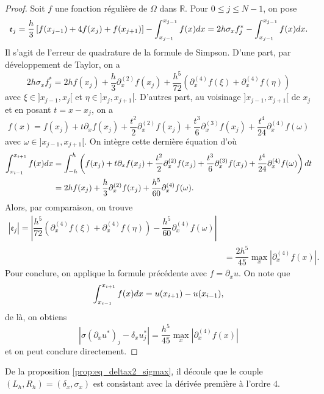 \begin{itemize}
\begin{proof}
Soit $f$ une fonction régulière de $\Omega$ dans $\mathbb{R}$. Pour $0 \leq j \leq N-1$, on pose
\begin{equation}
\mathfrak{e}_j = \dfrac{h}{3} \left[ f(x_{j-1}) + 4 f(x_j) + f(x_{j+1}) \right] - \displaystyle\int_{x_{j-1}}^{x_{j-1}} f(x) dx = 2h \sigma_x f^*_j - \displaystyle\int_{x_{j-1}}^{x_{j-1}} f(x) dx.
\end{equation}
Il s'agit de l'erreur de quadrature de la formule de Simpson.
D'une part, par développement de Taylor, on a
\begin{equation}
2h \sigma_x f^*_j = 2h f(x_j) + \dfrac{h}{3}\partial_x^{(2)}f(x_j) + \dfrac{h^5}{72} \left( \partial_x^{(4)}f(\xi) + \partial_x^{(4)}f(\eta) \right) 
\end{equation}
avec $\xi \in ]x_{j-1}, x_j[$ et $\eta \in ]x_j, x_{j+1}[$.
D'autres part, au voisinage $]x_{j-1}, x_{j+1}[$ de $x_j$ et en posant $t=x-x_j$, on a 
\begin{equation}
f(x) = f(x_j) + t \partial_x f(x_j) + \dfrac{t^2}{2} \partial_x^{(2)} f(x_j) + \dfrac{t^3}{6} \partial_x^{(3)} f(x_j) + \dfrac{t^4}{24} \partial_x^{(4)} f(\omega)
\end{equation}
avec $\omega \in ]x_{j-1}, x_{j+1}[$. On intègre cette dernière équation d'où
\begin{align*}
\displaystyle\int_{x_{i-1}}^{x_{i+1}} f(x) dx & = \displaystyle\int_{-h}^h \left( f(x_j) + t \partial_x f(x_j) + \dfrac{t^2}{2} \partial_x^{(2)} f(x_j) + \dfrac{t^3}{6} \partial_x^{(3)} f(x_j) + \dfrac{t^4}{24} \partial_x^{(4)} f(\omega) \right) dt \\
	& = 2h f(x_j) + \dfrac{h}{3}\partial_x^{(2)}f(x_j) + \dfrac{h^5}{60}\partial_x^{(4)} f(\omega).
\end{align*}
Alors, par comparaison, on trouve
\begin{align*}
|\mathfrak{e}_j| = |\dfrac{h^5}{72} \left( \partial_x^{(4)}f(\xi) + \partial_x^{(4)}f(\eta) \right)  - \dfrac{h^5}{60}\partial_x^{(4)} f(\omega)|  \\
	& = \dfrac{2 h^5}{45} \max_{x} |\partial_x^{(4)} f(x)|.
\end{align*}
Pour conclure, on applique la formule précédente avec $f = \partial_x u$. On note que 
\begin{equation}
\displaystyle\int_{x_{i-1}}^{x_{i+1}}f(x) dx = u(x_{i+1}) - u(x_{i-1}),
\end{equation}
de là, on obtiens
\begin{equation}
|\sigma \left( \partial_x u^* \right)_j - \delta_x u^*_j | = \dfrac{h^5}{45}\max_{x} |\partial_x^{(4)} f(x)|
\end{equation}
et on peut conclure directement.
\end{proof}
De la proposition \ref{prop:eq_deltax2_sigmax}, il découle que le couple $(L_h, R_h) = (\delta_x, \sigma_x)$ est consistant avec la dérivée première à l'ordre $4$.
\end{itemize}

